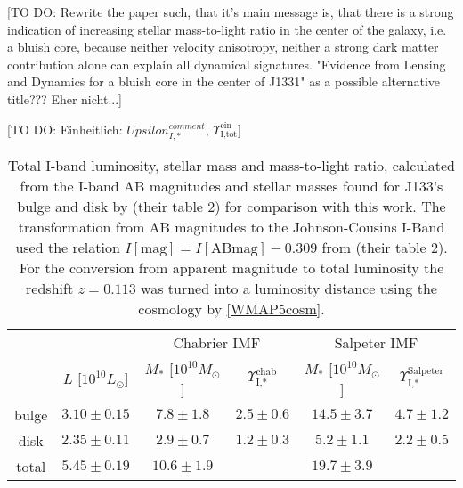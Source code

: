 [TO DO: Rewrite the paper such, that it's main message is, that there is a strong indication of increasing stellar mass-to-light ratio in the center of the galaxy, i.e. a bluish core, because neither velocity anisotropy, neither a strong dark matter contribution alone can explain all dynamical signatures. "Evidence from Lensing and Dynamics for a bluish core in the center of J1331" as a possible alternative title??? Eher nicht...]

[TO DO: Einheitlich: $Upsilon_{I,*}^{comment}$, $\Upsilon_\text{I,tot}^\text{ein}$]

\begin{table*}
\centering
\begin{tabular}{cccccc}
\hline\hline
& & \multicolumn{2}{c}{Chabrier IMF} & \multicolumn{2}{c}{Salpeter IMF}\\
      &  $L$ [$10^{10}L_{\odot}$]                & $M_*$ [$10^{10}M_\odot$]               & $\Upsilon_\text{I,*}^\text{chab}$ & $M_*$ [$10^{10}M_\odot$] & $\Upsilon_\text{I,*}^\text{Salpeter}$ \\\hline
bulge &   $3.10 \pm 0.15 $  & $7.8 \pm 1.8$ & $2.5 \pm 0.6$ & $14.5 \pm 3.7 $ & $4.7 \pm 1.2$ \\
disk  &   $2.35 \pm 0.11 $  & $2.9 \pm 0.7$ & $1.2 \pm 0.3$ & $5.2 \pm 1.1$ & $2.2 \pm 0.5$ \\
total &   $5.45 \pm 0.19$ & $10.6 \pm 1.9$& & $19.7 \pm 3.9$&\\\hline
\end{tabular}
\caption{Total I-band luminosity, stellar mass and mass-to-light ratio, calculated from the I-band AB magnitudes and stellar masses found for J133's bulge and disk by \citet{SWELLS} (their table 2) for comparison with this work. The transformation from AB magnitudes to the Johnson-Cousins I-Band used the relation $I[\text{mag}] = I[\text{ABmag}] - 0.309$ from \citet{FG1994} (their table 2). For the conversion from apparent magnitude to total luminosity the redshift $z=0.113$ \citet{SWELLSIII} was turned into a luminosity distance using the cosmology by \ref{WMAP5cosm}. }
\label{tab:previousresults}
\end{table*}